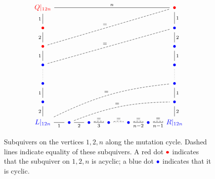 \documentclass[11pt, letterpaper]{amsart}
\theoremstyle{definition}
\numberwithin{equation}{section}
\newcommand{\red}[1]{{\color{red} #1}}
\newcommand{\blue}[1]{{\color{blue} #1}}
\begin{document}
\begin{figure}[ht]
\begin{equation*}
\begin{tikzcd}[arrows={-stealth, cramped}, sep=15]
\red{Q|_{12n}}  \arrow[rrrrrr, no head, "n"] \arrow[d, swap, no head, "1"]
  &&&&&& \red{\bullet} \arrow[d, no head, "1"] \\
\red{\bullet} \arrow[d, swap, no head,"2"] &&&&&&  \blue{\bullet} \arrow[d, no head,"2"]  \\
\red{\bullet} \arrow[d, swap, no head,"1"] \arrow[uurrrrrr, dashed, no head,"="] &&&&&&  \blue{\bullet} \arrow[d, no head,"1"]  \\
\blue{\bullet} \arrow[d, swap, no head,dotted] \arrow[uurrrrrr, dashed, no head,"="] &&&&&&  \blue{\bullet} \arrow[d, no head,dotted]  \\
\blue{\bullet} \arrow[d, swap, no head,"1"] &&&&&&  \blue{\bullet} \arrow[d, no head,"1"]  \\
\blue{\bullet} \arrow[d, swap, no head,"2"] &&&&&&  \blue{\bullet} \arrow[d, no head,"2"]  \\
\blue{L|_{12n}} \arrow[r, swap, no head, "1"] \arrow[uurrrrrr, dashed, bend left=10pt, no head,"="] 
    & \blue{\bullet} \arrow[r, swap, no head, "2" ] \arrow[urrrrr, dashed, bend left=10pt, no head,"="]
   & \blue{\bullet} \arrow[r, swap, no head,"3"] \arrow[r, dashed, bend left=10pt, no head,"="]
   & \blue{\bullet} \arrow[r, dotted, no head] \arrow[r, dashed, bend left=10pt, no head,"="] 
   & \blue{\bullet} \arrow[r, swap, no head,"n-2"] \arrow[r, dashed, bend left=10pt, no head,"="] 
   & \blue{\bullet} \arrow[r, swap, no head,"n-1"] \arrow[r, dashed, bend left=10pt, in=175, no head,"="] 
   & \blue{R|_{12n}}
\end{tikzcd}
\end{equation*}
\caption{Subquivers on the vertices $1,2,n$ along the mutation cycle. 
Dashed lines indicate equality of these subquivers. 
A red dot $\red{\bullet}$ indicates that the subquiver on $1,2,n$ is acyclic; a blue dot $\blue{\bullet}$ indicates that it is cyclic.
}
\vspace{-.2in}
\label{fig:Q12nShapes}
\end{figure}
\end{document}
